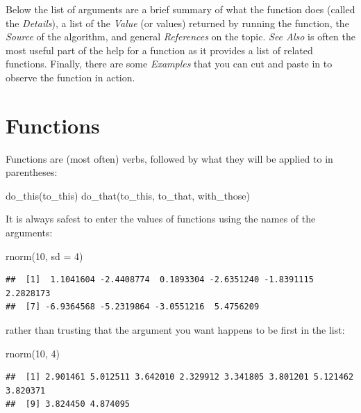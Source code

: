 \documentclass[
]{book}
\newenvironment{Shaded}{\begin{snugshade}}{\end{snugshade}}
\newcommand{\AttributeTok}[1]{\textcolor[rgb]{0.77,0.63,0.00}{#1}}
\newcommand{\DecValTok}[1]{\textcolor[rgb]{0.00,0.00,0.81}{#1}}
\newcommand{\FunctionTok}[1]{\textcolor[rgb]{0.00,0.00,0.00}{#1}}
\newcommand{\NormalTok}[1]{#1}
\begin{document}
Below the list of arguments are a brief summary of what the function does (called the \emph{Details}), a list of the \emph{Value} (or values) returned by running the function, the \emph{Source} of the algorithm, and general \emph{References} on the topic. \emph{See Also} is often the most useful part of the help for a function as it provides a list of related functions. Finally, there are some \emph{Examples} that you can cut and paste in to observe the function in action.

\hypertarget{functions}{%
\section{Functions}\label{functions}}

Functions are (most often) verbs, followed by what they will be applied to in parentheses:

\begin{Shaded}
\begin{Highlighting}[]
\FunctionTok{do\_this}\NormalTok{(to\_this)}
\FunctionTok{do\_that}\NormalTok{(to\_this, to\_that, with\_those)}
\end{Highlighting}
\end{Shaded}

It is always safest to enter the values of functions using the names of the arguments:

\begin{Shaded}
\begin{Highlighting}[]
\FunctionTok{rnorm}\NormalTok{(}\DecValTok{10}\NormalTok{, }\AttributeTok{sd =} \DecValTok{4}\NormalTok{)}
\end{Highlighting}
\end{Shaded}

\begin{verbatim}
##  [1]  1.1041604 -2.4408774  0.1893304 -2.6351240 -1.8391115  2.2828173
##  [7] -6.9364568 -5.2319864 -3.0551216  5.4756209
\end{verbatim}

rather than trusting that the argument you want happens to be first in the list:

\begin{Shaded}
\begin{Highlighting}[]
\FunctionTok{rnorm}\NormalTok{(}\DecValTok{10}\NormalTok{, }\DecValTok{4}\NormalTok{)}
\end{Highlighting}
\end{Shaded}

\begin{verbatim}
##  [1] 2.901461 5.012511 3.642010 2.329912 3.341805 3.801201 5.121462 3.820371
##  [9] 3.824450 4.874095
\end{verbatim}
\end{document}
